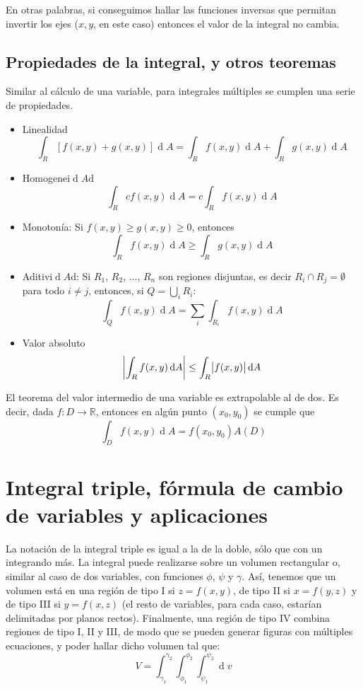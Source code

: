 \documentclass[a4paper]{article}
\renewcommand{\d}[1]{\ensuremath{\operatorname{d}\!{#1}}}
\begin{document}
En otras palabras, si conseguimos hallar las funciones inversas que permitan invertir los ejes ($x, y$, en este caso) entonces el valor de la integral no cambia.

\subsection{Propiedades de la integral, y otros teoremas}
Similar al cálculo de una variable, para integrales múltiples se cumplen una serie de propiedades.
\begin{itemize}
	\item Linealidad 
	\[ \int_R[f(x,y)+g(x,y) ]\d{A} = \int_Rf(x,y)\d{A} + \int_R g(x,y) \d{A} \]
	\item Homogenei\d{A}d 
	\[ \int_R cf(x,y)\d{A} = c\int_Rf(x,y)\d{A} \]
	\item Monotonía: Si $f(x,y) \ge g(x,y) \ge 0$, entonces
	\[ \int_R f(x,y) \d{A} \ge \int_R g(x,y) \d{A} \]
	\item Aditivi\d{A}d: Si $R_1$, $R_2$, ..., $R_n$ son regiones disjuntas, es decir $R_i \cap R_j = \emptyset$ para todo $i \neq j$, entonces, si $Q = \bigcup_i R_i$:
	\[ \int_Q f(x,y) \d{A} = \sum_i \int_{R_i} f(x,y) \d{A} \]
	\item Valor absoluto
	\[ \left| \int_R f(x,y) \d{A} \right| \le \int_R \abs{f(x,y)} \d{A}  \]
\end{itemize}

El teorema del valor intermedio de una variable es extrapolable al de dos. Es decir, dada $f:D\rightarrow\mathbb{R}$, entonces en algún punto $(x_0, y_0)$ se cumple que 
\[ \int_D f(x,y) \d{A} = f(x_0, y_0) A(D) \]

\section{Integral triple, fórmula de cambio de variables y aplicaciones}
La notación de la integral triple es igual a la de la doble, sólo que con un integrando más. La integral puede realizarse sobre un volumen rectangular o, similar al caso de dos variables, con funciones $\phi$, $\psi$ y $\gamma$. Así, tenemos que un volumen está en una región de tipo I si $z = f(x,y)$, de tipo II si $x = f(y,z)$ y de tipo III si $y = f(x,z)$ (el resto de variables, para cada caso, estarían delimitadas por planos rectos). Finalmente, una región de tipo IV combina regiones de tipo I, II y III, de modo que se pueden generar figuras con múltiples ecuaciones, y poder hallar dicho volumen tal que:
\[ V = \int^{\gamma_2}_{\gamma_1}\int^{\phi_2}_{\phi_1}\int^{\psi_2}_{\psi_1} \d{v} \]
\end{document}
